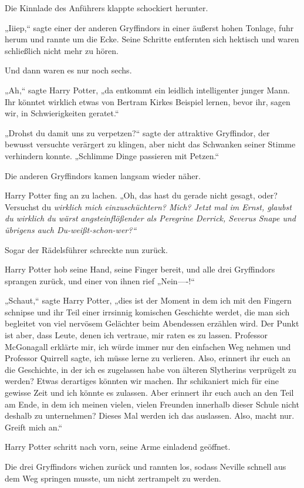 {Die Kinnlade des Anführers klappte schockiert herunter.

„Iiiep,“ sagte einer der anderen Gryffindors in einer äußerst hohen Tonlage, fuhr herum und rannte um die Ecke. Seine Schritte entfernten sich hektisch und waren schließlich nicht mehr zu hören.

Und dann waren es nur noch sechs.

„Ah,“ sagte Harry Potter, „da entkommt ein leidlich intelligenter junger Mann. Ihr könntet wirklich etwas von Bertram Kirkes Beispiel lernen, bevor ihr, sagen wir, in Schwierigkeiten geratet.“

„Drohst du damit uns zu verpetzen?“ sagte der attraktive Gryffindor, der bewusst versuchte verärgert zu klingen, aber nicht das Schwanken seiner Stimme verhindern konnte. „Schlimme Dinge passieren mit Petzen.“

Die anderen Gryffindors kamen langsam wieder näher.

Harry Potter fing an zu lachen. „Oh, das hast du gerade nicht gesagt, oder? Versuchst du \emph{wirklich mich einzuschüchtern? \emph{Mich?} Jetzt mal im Ernst, glaubst du wirklich du wärst angsteinflößender als Peregrine Derrick, Severus Snape und übrigens auch Du-weißt-schon-wer?“}

Sogar der Rädelsführer schreckte nun zurück.

Harry Potter hob seine Hand, seine Finger bereit, und alle drei Gryffindors sprangen zurück, und einer von ihnen rief „Nein----!“

„Schaut,“ sagte Harry Potter, „dies ist der Moment in dem ich mit den Fingern schnipse und ihr Teil einer irrsinnig komischen Geschichte werdet, die man sich begleitet von viel nervösem Gelächter beim Abendessen erzählen wird. Der Punkt ist aber, dass Leute, denen ich vertraue, mir raten es zu lassen. Professor McGonagall erklärte mir, ich würde immer nur den einfachen Weg nehmen und Professor Quirrell sagte, ich müsse lerne zu verlieren. Also, erinnert ihr euch an die Geschichte, in der ich es zugelassen habe von älteren Slytherins verprügelt zu werden? Etwas derartiges könnten wir machen. Ihr schikaniert mich für eine gewisse Zeit und ich könnte es zulassen. Aber erinnert ihr euch auch an den Teil am Ende, in dem ich meinen vielen, vielen Freunden innerhalb dieser Schule nicht deshalb zu unternehmen? Dieses Mal werden ich das auslassen. Also, macht nur. Greift mich an.“

Harry Potter schritt nach vorn, seine Arme einladend geöffnet.

Die drei Gryffindors wichen zurück und rannten los, sodass Neville schnell aus dem Weg springen musste, um nicht zertrampelt zu werden.

}
